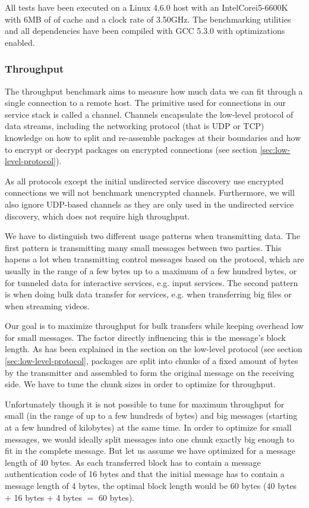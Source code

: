 \medskip

All tests have been executed on a Linux 4.6.0 host with an Intel\textregistered Core\texttrademark i5-6600K with 6MB of of cache and a clock rate of 3.50GHz.
The benchmarking utilities and all dependencies have been compiled with GCC 5.3.0 with optimizations enabled.

\subsubsection{Throughput}

The throughput benchmark aims to measure how much data we can fit through a single connection to a remote host.
The primitive used for connections in our service stack is called a channel.
Channels encapsulate the low-level protocol of data streams, including the networking protocol (that is UDP or TCP) knowledge on how to split and re-assemble packages at their boundaries and how to encrypt or decrypt packages on encrypted connections (see section \ref{sec:low-level-protocol}).

As all protocols except the initial undirected service discovery use encrypted connections we will not benchmark unencrypted channels.
Furthermore, we will also ignore UDP-based channels as they are only used in the undirected service discovery, which does not require high throughput.

\medskip

We have to distinguish two different usage patterns when transmitting data.
The first pattern is transmitting many small messages between two parties.
This hapens a lot when transmitting control messages based on the protocol, which are usually in the range of a few bytes up to a maximum of a few hundred bytes, or for tunneled data for interactive services, e.g. input services.
The second pattern is when doing bulk data transfer for services, e.g. when transferring big files or when streaming videos.

Our goal is to maximize throughput for bulk transfers while keeping overhead low for small messages.
The factor directly influencing this is the message's block length.
As has been explained in the section on the low-level protocol (see section \ref{sec:low-level-protocol}, packages are split into chunks of a fixed amount of bytes by the transmitter and assembled to form the original message on the receiving side.
We have to tune the chunk sizes in order to optimize for throughput.

Unfortunately though it is not possible to tune for maximum throughput for small (in the range of up to a few hundreds of bytes) and big messages (starting at a few hundred of kilobytes) at the same time.
In order to optimize for small messages, we would ideally split messages into one chunk exactly big enough to fit in the complete message.
But let us assume we have optimized for a message length of 40 bytes.
As each transferred block has to contain a message authentication code of 16 bytes and that the initial message has to contain a message length of 4 bytes, the optimal block length would be 60 bytes (40 bytes $+$ 16 bytes $+$ 4 bytes $=$ 60 bytes).

